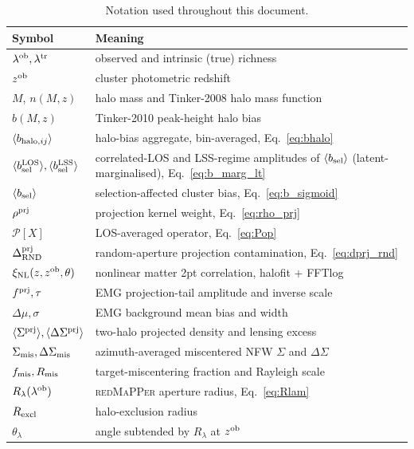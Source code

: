 \documentclass[a4paper, 11pt]{article}
\newcommand{\lob}{\lambda^{\rm ob}}
\newcommand{\ltr}{\lambda^{\rm tr}}
\newcommand{\zob}{z^{\rm ob}}
\newcommand{\dprj}{\Delta^{\rm prj}}
\newcommand{\xinl}{\xi_{\rm NL}}
\newcommand{\Pop}{\mathcal{P}}
\newcommand{\bbsel}{\avg{b_{\rm sel}}}
\newcommand{\bbLOS}{\avg{b_{\rm sel}^{\rm LOS}}}
\newcommand{\bbLSS}{\avg{b_{\rm sel}^{\rm LSS}}}
\newcommand{\bbhaloij}{\avg{b_{{\rm halo},ij}}}
\newcommand{\rhoprj}{\rho^{\rm prj}}
\newcommand{\Sprj}{\Sigma^{\rm prj}}
\newcommand{\Smis}{\Sigma_{\rm mis}}
\newcommand{\DSprj}{\Delta\Sigma^{\rm prj}}
\newcommand{\DSmis}{\Delta\Sigma_{\rm mis}}
\newcommand{\Rmis}{R_{\rm mis}}
\newcommand{\avg}[1]{\langle #1 \rangle}
\begin{document}
\renewcommand{\arraystretch}{1.2}
\begin{table}[H]
\centering
\small
\begin{tabular}{@{}p{} p{}@{}}
\toprule
Symbol & Meaning \\
\midrule
$\lob,\ltr$ & observed and intrinsic (true) richness \\
$\zob$ & cluster photometric redshift \\
$M$, $n(M,z)$ & halo mass and Tinker-2008 halo mass function \\
$b(M,z)$ & Tinker-2010 peak-height halo bias \\
$\bbhaloij$ & halo-bias aggregate, bin-averaged, Eq.~\eqref{eq:bhalo} \\
$\bbLOS,\bbLSS$ & correlated-LOS and LSS-regime amplitudes of $\bbsel$ (latent-marginalised), Eq.~\eqref{eq:b_marg_lt} \\
$\bbsel$ & selection-affected cluster bias, Eq.~\eqref{eq:b_sigmoid} \\
$\rhoprj$ & projection kernel weight, Eq.~\eqref{eq:rho_prj} \\
$\Pop[X]$ & LOS-averaged operator, Eq.~\eqref{eq:Pop} \\
$\dprj_{\rm RND}$ & random-aperture projection contamination, Eq.~\eqref{eq:dprj_rnd} \\
$\xinl(z,\zob,\theta)$ & nonlinear matter 2pt correlation, halofit + FFTlog \\
$f^{\rm prj},\tau$ & EMG projection-tail amplitude and inverse scale \\
$\Delta\mu,\sigma$ & EMG background mean bias and width \\
$\avg{\Sprj},\avg{\DSprj}$ & two-halo projected density and lensing excess \\
$\Smis,\DSmis$ & azimuth-averaged miscentered NFW $\Sigma$ and $\Delta\Sigma$ \\
$f_{\rm mis},\Rmis$ & target-miscentering fraction and Rayleigh scale \\
$R_\lambda(\lob)$ & \textsc{redMaPPer} aperture radius, Eq.~\eqref{eq:Rlam} \\
$R_{\rm excl}$ & halo-exclusion radius \\
$\theta_\lambda$ & angle subtended by $R_\lambda$ at $\zob$ \\
\bottomrule
\end{tabular}
\caption{Notation used throughout this document.}
\label{tab:notation}
\end{table}
\end{document}
